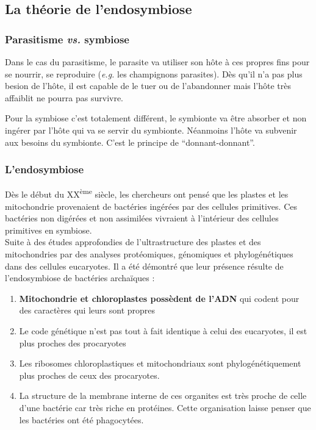 \documentclass[
]{book}
\begin{document}
\hypertarget{la-thuxe9orie-de-lendosymbiose}{%
\subsection{La théorie de l'endosymbiose}\label{la-thuxe9orie-de-lendosymbiose}}

\hypertarget{parasitisme-vs.-symbiose}{%
\subsubsection{\texorpdfstring{Parasitisme \emph{vs.} symbiose}{Parasitisme vs. symbiose}}\label{parasitisme-vs.-symbiose}}

Dans le cas du parasitisme, le parasite va utiliser son hôte à ces propres fins pour se nourrir, se reproduire (\emph{e.g.} les champignons parasites). Dès qu'il n'a pas plus besion de l'hôte, il est capable de le tuer ou de l'abandonner mais l'hôte très affaiblit ne pourra pas survivre.

Pour la symbiose c'est totalement différent, le symbionte va être absorber et non ingérer par l'hôte qui va se servir du symbionte. Néanmoins l'hôte va subvenir aux besoins du symbionte. C'est le principe de ``donnant-donnant''.

\hypertarget{lendosymbiose}{%
\subsubsection{L'endosymbiose}\label{lendosymbiose}}

Dès le début du XX\textsuperscript{ème} siècle, les chercheurs ont pensé que les plastes et les mitochondrie provenaient de bactéries ingérées par des cellules primitives. Ces bactéries non digérées et non assimilées vivraient à l'intérieur des cellules primitives en symbiose.\\
Suite à des études approfondies de l'ultrastructure des plastes et des mitochondries par des analyses protéomiques, génomiques et phylogénétiques dans des cellules eucaryotes. Il a été démontré que leur présence résulte de l'endosymbiose de bactéries archaïques :

\begin{enumerate}
\def\labelenumi{\arabic{enumi}.}
\item
  \textbf{Mitochondrie et chloroplastes possèdent de l'ADN} qui codent pour des caractères qui leurs sont propres
\item
  Le code génétique n'est pas tout à fait identique à celui des eucaryotes, il est plus proches des procaryotes
\item
  Les ribosomes chloroplastiques et mitochondriaux sont phylogénétiquement plus proches de ceux des procaryotes.
\item
  La structure de la membrane interne de ces organites est très proche de celle d'une bactérie car très riche en protéines. Cette organisation laisse penser que les bactéries ont été phagocytées.
\end{enumerate}
\end{document}
